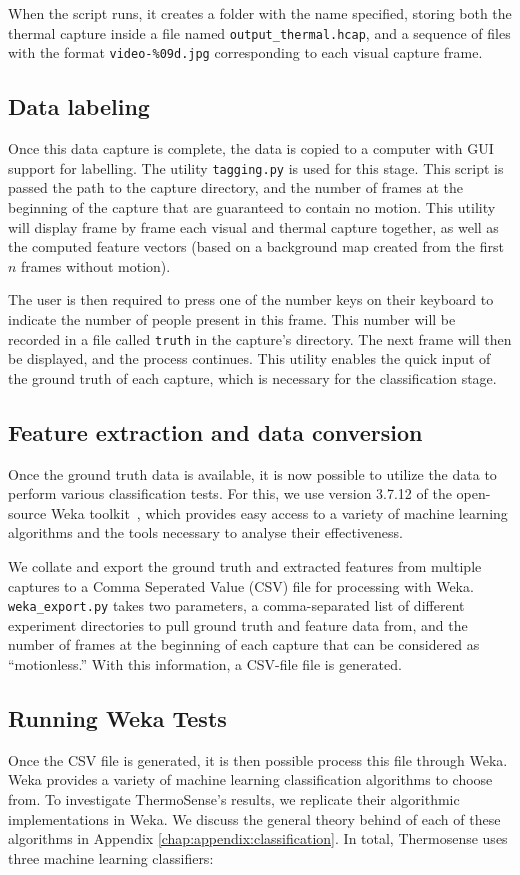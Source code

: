 \documentclass[../thesis/thesis.tex]{subfiles}
\begin{document}
When the script runs, it creates a folder with the name specified, storing both the thermal capture inside a file named \texttt{output\_thermal.hcap}, and a sequence of files with the format \texttt{video-\%09d.jpg} corresponding to each visual capture frame.

\subsection{Data labeling}
\label{subsec:datalabelling}
Once this data capture is complete, the data is copied to a computer with GUI support for labelling. The utility \texttt{tagging.py} is used for this stage. This script is passed the path to the capture directory, and the number of frames at the beginning of the capture that are guaranteed to contain no motion. This utility will display frame by frame each visual and thermal capture together, as well as the computed feature vectors (based on a background map created from the first $n$ frames without motion).

The user is then required to press one of the number keys on their keyboard to indicate the number of people present in this frame. This number will be recorded in a file called \texttt{truth} in the capture's directory. The next frame will then be displayed, and the process continues. This utility enables the quick input of the ground truth of each capture, which is necessary for the classification stage.

\subsection{Feature extraction and data conversion}
Once the ground truth data is available, it is now possible to utilize the data to perform various classification tests. For this, we use version 3.7.12 of the open-source Weka toolkit~\cite{Weka}, which provides easy access to a variety of machine learning algorithms and the tools necessary to analyse their effectiveness.

We collate and export the ground truth and extracted features from multiple captures to a Comma Seperated Value (CSV) file for processing with Weka. \texttt{weka\_export.py} takes two parameters, a comma-separated list of different experiment directories to pull ground truth and feature data from, and the number of frames at the beginning of each capture that can be considered as ``motionless.'' With this information, a CSV-file file is generated.

\subsection{Running Weka Tests}
Once the CSV file is generated, it is then possible process this file through Weka. Weka provides a variety of machine learning classification algorithms to choose from. To investigate ThermoSense's results, we replicate their algorithmic implementations in Weka. We discuss the general theory behind of each of these algorithms in Appendix \ref{chap:appendix:classification}. In total, Thermosense uses three machine learning classifiers:
\end{document}
